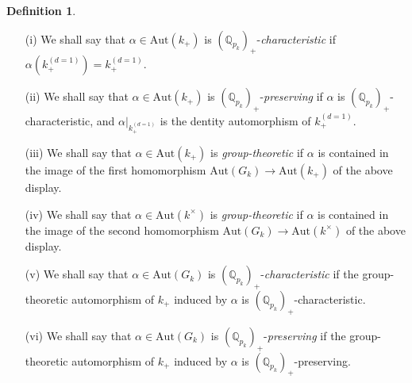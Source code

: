 \documentclass[11pt,showkeys]{article}
\theoremstyle{theorem}
\theoremstyle{definition}
\newtheorem{definition}[theorem]{Definition}
\def\bQ{{\mathbb Q}}
\def\Aut{{\mbox{Aut}}}
\begin{document}
\begin{definition}\label{definition:2.1}    
       \ \ \ 
\begin{enumerate}[label=(\roman*),ref=(\roman*)]
   \item[\rm (i)]  We shall say that $\alpha \in \Aut(k_+)$ is $(\bQ_{p_k})_+$-{\it characteristic} if $\alpha(k^{(d=1)}_+) = k^{(d=1)}_+$. \label{definition:2.1:statement1} 
   \item[\rm (ii)] We shall say that $\alpha \in \Aut(k_+)$ is $(\bQ_{p_k})_+$-{\it preserving} if $\alpha$ is $(\bQ_{p_k})_+$-characteristic, and $\left. \alpha \right|_{k^{(d=1)}_+}$ is the dentity automorphism of $k_+^{(d=1)}$.  \label{definition:2.1:statement:2} 
   \item[\rm (iii)]  We shall say that $\alpha \in \Aut(k_+)$ is {\it group-theoretic} if $\alpha$ is contained in the image of the first homomorphism $\Aut(G_k) \to \Aut(k_+)$ of the above display. \label{definition:2.1:statement:3} 
\item[\rm (iv)]  We shall say that $\alpha \in \Aut(k^{\times})$ is {\it group-theoretic} if $\alpha$ is contained in the image of the second homomorphism $\Aut(G_k) \to \Aut(k^\times)$ of the above display. \label{definition:2.1:statement:4}    
   \item[\rm (v)]  We shall say that $\alpha \in \Aut(G_k)$ is $(\bQ_{p_k})_+$-{\it characteristic} if the group-theoretic automorphism of $k_+$ induced by $\alpha$ is $(\bQ_{p_k})_+$-characteristic. \label{definition:2.1:statement:5} 
   \item[\rm (vi)] We shall say that $\alpha \in \Aut(G_k)$ is $(\bQ_{p_k})_+$-{\it preserving} if the group-theoretic automorphism of $k_+$ induced by $\alpha$ is $(\bQ_{p_k})_+$-preserving.  \label{definition:2.1:statement:6} 
\end{enumerate}
\end{definition}
\end{document}
